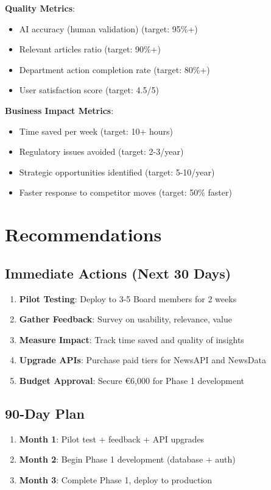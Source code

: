 \documentclass[11pt,a4paper]{article}
\begin{document}
\textbf{Quality Metrics}:
\begin{itemize}[leftmargin=*]
    \item AI accuracy (human validation) (target: 95\%+)
    \item Relevant articles ratio (target: 90\%+)
    \item Department action completion rate (target: 80\%+)
    \item User satisfaction score (target: 4.5/5)
\end{itemize}

\textbf{Business Impact Metrics}:
\begin{itemize}[leftmargin=*]
    \item Time saved per week (target: 10+ hours)
    \item Regulatory issues avoided (target: 2-3/year)
    \item Strategic opportunities identified (target: 5-10/year)
    \item Faster response to competitor moves (target: 50\% faster)
\end{itemize}

\section{Recommendations}

\subsection{Immediate Actions (Next 30 Days)}
\begin{enumerate}[leftmargin=*]
    \item \textbf{Pilot Testing}: Deploy to 3-5 Board members for 2 weeks
    \item \textbf{Gather Feedback}: Survey on usability, relevance, value
    \item \textbf{Measure Impact}: Track time saved and quality of insights
    \item \textbf{Upgrade APIs}: Purchase paid tiers for NewsAPI and NewsData
    \item \textbf{Budget Approval}: Secure \euro 6,000 for Phase 1 development
\end{enumerate}

\subsection{90-Day Plan}
\begin{enumerate}[leftmargin=*]
    \item \textbf{Month 1}: Pilot test + feedback + API upgrades
    \item \textbf{Month 2}: Begin Phase 1 development (database + auth)
    \item \textbf{Month 3}: Complete Phase 1, deploy to production
\end{enumerate}
\end{document}

